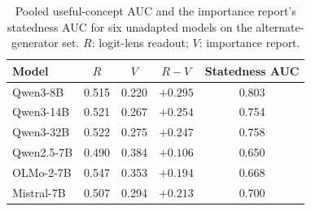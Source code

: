 \begin{table}[!htbp]
\centering
\caption{Pooled useful-concept AUC and the importance report's statedness AUC for six unadapted models on the alternate-generator set. $R$: logit-lens readout; $V$: importance report.}
\label{tab:replications}
\small
\setlength{\tabcolsep}{5pt}
\begin{tabular}{@{}lcccc@{}}
\toprule
Model & $R$ & $V$ & $R-V$ & Statedness AUC \\
\midrule
Qwen3-8B & 0.515 & 0.220 & $+0.295$ & 0.803 \\
Qwen3-14B & 0.521 & 0.267 & $+0.254$ & 0.754 \\
Qwen3-32B & 0.522 & 0.275 & $+0.247$ & 0.758 \\
Qwen2.5-7B & 0.490 & 0.384 & $+0.106$ & 0.650 \\
OLMo-2-7B & 0.547 & 0.353 & $+0.194$ & 0.668 \\
Mistral-7B & 0.507 & 0.294 & $+0.213$ & 0.700 \\
\bottomrule
\end{tabular}
\end{table}
